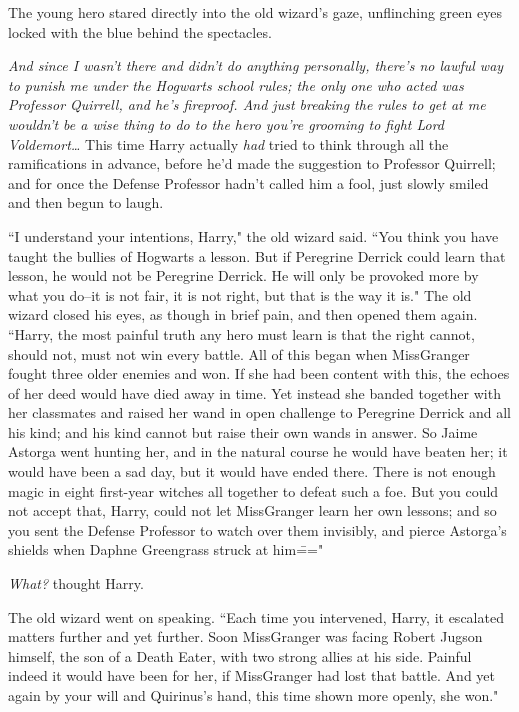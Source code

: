 The young hero stared directly into the old wizard's gaze, unflinching green eyes locked with the blue behind the spectacles.

\emph{And since I wasn't there and didn't do anything personally, there's no lawful way to punish me under the Hogwarts school rules; the only one who acted was Professor Quirrell, and he's fireproof. And just breaking the rules to get at me wouldn't be a wise thing to do to the hero you're grooming to fight Lord Voldemort{\ldots}} This time Harry actually \emph{had} tried to think through all the ramifications in advance, before he'd made the suggestion to Professor Quirrell; and for once the Defense Professor hadn't called him a fool, just slowly smiled and then begun to laugh.

``I understand your intentions, Harry," the old wizard said. ``You think you have taught the bullies of Hogwarts a lesson. But if Peregrine Derrick could learn that lesson, he would not be Peregrine Derrick. He will only be provoked more by what you do\---it is not fair, it is not right, but that is the way it is." The old wizard closed his eyes, as though in brief pain, and then opened them again. ``Harry, the most painful truth any hero must learn is that the right cannot, should not, must not win every battle. All of this began when Miss\?Granger fought three older enemies and won. If she had been content with this, the echoes of her deed would have died away in time. Yet instead she banded together with her classmates and raised her wand in open challenge to Peregrine Derrick and all his kind; and his kind cannot but raise their own wands in answer. So Jaime Astorga went hunting her, and in the natural course he would have beaten her; it would have been a sad day, but it would have ended there. There is not enough magic in eight first-year witches all together to defeat such a foe. But you could not accept that, Harry, could not let Miss\?Granger learn her own lessons; and so you sent the Defense Professor to watch over them invisibly, and pierce Astorga's shields when Daphne Greengrass struck at him\==="

\emph{What?} thought Harry.

The old wizard went on speaking. ``Each time you intervened, Harry, it escalated matters further and yet further. Soon Miss\?Granger was facing Robert Jugson himself, the son of a Death Eater, with two strong allies at his side. Painful indeed it would have been for her, if Miss\?Granger had lost that battle. And yet again by your will and Quirinus's hand, this time shown more openly, she won."

